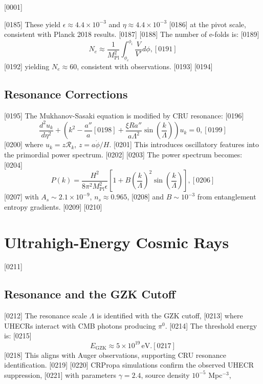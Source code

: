 [0001] \documentclass[12pt]{report}
[0002] \usepackage[utf8]{inputenc}
\begin{document}
[0185] These yield $\epsilon \approx 4.4 \times 10^{-3}$ and $\eta \approx 4.4 \times 10^{-3}$ 
[0186] at the pivot scale, consistent with Planck 2018 results.
[0187] 
[0188] The number of e-folds is:
[0189] \begin{equation}
[0190] N_e \approx \frac{1}{M_{\text{Pl}}^2} \int_{\phi_e}^{\phi_i} \frac{V}{V'} d\phi,
[0191] \end{equation}
[0192] yielding $N_e \approx 60$, consistent with observations.
[0193] 
[0194] \section{Resonance Corrections}
[0195] The Mukhanov-Sasaki equation is modified by CRU resonance:
[0196] \begin{equation}
[0197] \frac{d^2 u_k}{d\eta^2} + \left(k^2 - \frac{a''}{a} 
[0198] + \frac{\xi R a''}{a \Lambda^2} \sin\left(\frac{k}{\Lambda}\right)\right) u_k = 0,
[0199] \end{equation}
[0200] where $u_k = z \mathcal{R}_k$, $z = a \dot{\phi}/H$. 
[0201] This introduces oscillatory features into the primordial power spectrum.
[0202] 
[0203] The power spectrum becomes:
[0204] \begin{equation}
[0205] P(k) = \frac{H^2}{8 \pi^2 M_{\text{Pl}}^2 \epsilon} 
\left[1 + B \left(\frac{k}{\Lambda}\right)^2 \sin\left(\frac{k}{\Lambda}\right)\right],
[0206] \end{equation}
[0207] with $A_s \sim 2.1 \times 10^{-9}$, $n_s \approx 0.965$, 
[0208] and $B \sim 10^{-3}$ from entanglement entropy gradients.
[0209] 
[0210] \chapter{Ultrahigh-Energy Cosmic Rays}
[0211] \section{Resonance and the GZK Cutoff}
[0212] The resonance scale $\Lambda$ is identified with the GZK cutoff, 
[0213] where UHECRs interact with CMB photons producing $\pi^0$.
[0214] The threshold energy is:
[0215] \begin{equation}
[0216] E_{\text{GZK}} \approx 5 \times 10^{19} \, \text{eV}.
[0217] \end{equation}
[0218] This aligns with Auger observations, supporting CRU resonance identification.
[0219] 
[0220] CRPropa simulations confirm the observed UHECR suppression, 
[0221] with parameters $\gamma = 2.4$, source density $10^{-5}$ Mpc$^{-3}$, 
\end{document}
